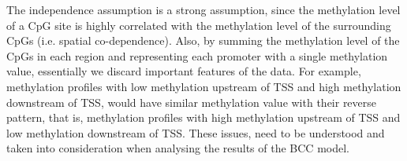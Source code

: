 The independence assumption is a strong assumption, since the methylation level of a CpG site is highly correlated with the methylation level of the surrounding CpGs (i.e. spatial co-dependence). Also, by summing the methylation level of the CpGs in each region and representing each promoter with a single methylation value, essentially we discard  important features of the data. For example, methylation profiles with low methylation upstream of TSS and high methylation downstream of TSS, would have similar methylation value with their reverse pattern, that is, methylation profiles with high methylation upstream of TSS and low methylation downstream of TSS. These issues, need to be understood and taken into consideration when analysing the results of the BCC model.